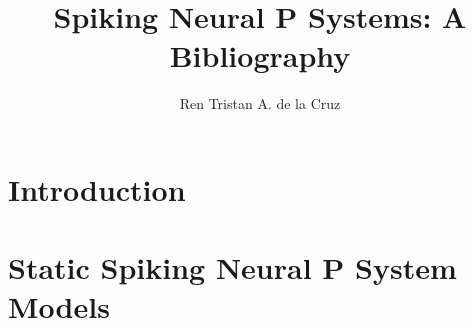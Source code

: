 \documentclass[a4paper]{article}
\begin{document}
\title
{
   Spiking Neural P Systems: A Bibliography
}


\author
{
   Ren Tristan A. de la Cruz
}


\maketitle


\section{Introduction}


\section{Static Spiking Neural P System Models} \label{s-snp-models}
\end{document}
